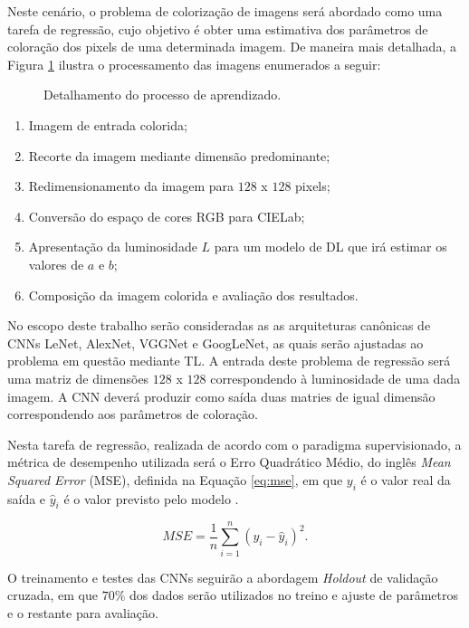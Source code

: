 Neste cenário, o problema de colorização de imagens será abordado como uma tarefa de regressão, cujo objetivo é obter uma estimativa dos parâmetros de coloração dos pixels de uma determinada imagem. De maneira mais detalhada, a Figura \ref{fig:aprendizado} ilustra o processamento das imagens enumerados a seguir:

\begin{figure}[h]
	\centering
	\caption{Detalhamento do processo de aprendizado.}
	\label{fig:aprendizado}
\end{figure}

\begin{enumerate}
	\item Imagem de entrada colorida;
	\item Recorte da imagem mediante dimensão predominante;
	\item Redimensionamento da imagem para $128$ x $128$ pixels;
	\item Conversão do espaço de cores RGB para CIELab;
	\item Apresentação da luminosidade $L$ para um modelo de DL que irá estimar os valores de $a$ e $b$;
	\item Composição da imagem colorida e avaliação dos resultados. 
\end{enumerate}

No escopo deste trabalho serão consideradas as as arquiteturas canônicas de CNNs LeNet, AlexNet, VGGNet e GoogLeNet, as quais serão ajustadas ao problema em questão mediante TL. A entrada deste problema de regressão será uma matriz de dimensões $128$ x $128$ correspondendo à luminosidade de uma dada imagem. A CNN deverá produzir como saída duas matries de igual dimensão correspondendo aos parâmetros de coloração.

Nesta tarefa de regressão, realizada de acordo com o paradigma supervisionado, a métrica de desempenho utilizada será o Erro Quadrático Médio, do inglês \emph{Mean Squared Error} (MSE), definida na Equação \ref{eq:mse}, em que $y_i$ é o valor real da saída e $\hat{y}_i$ é o valor previsto pelo modelo \cite{ref:faceli}.

\begin{equation}
MSE = \frac{1}{n}\sum_{i=1}^n (y_i - \hat{y}_i)^{2}. \label{eq:mse}
\end{equation}

O treinamento e testes das CNNs seguirão a abordagem \emph{Holdout} de validação cruzada, em que $70\%$ dos dados serão utilizados no treino e ajuste de parâmetros e o restante para avaliação. 

